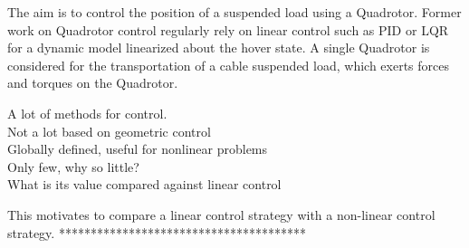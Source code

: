     				The aim is to control the position of a suspended load using a Quadrotor. Former work on Quadrotor control regularly rely on linear control such as PID or LQR for a dynamic model linearized about the hover state. A single Quadrotor is considered for the transportation of a cable suspended load, which exerts forces and torques on the Quadrotor. 
%    				    				

A lot of methods for  control.\\
Not a lot based on geometric control\\
Globally defined, useful for nonlinear problems\\
Only few, why so little?\\
What is its value compared against linear control

    				This motivates to compare a linear control strategy with a non-linear control strategy. 
%    
    ***************************************\\


